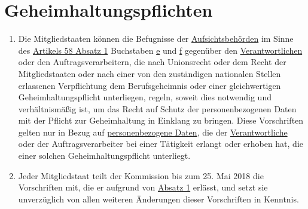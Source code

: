 \chapter{Geheimhaltungspflichten}
\label{ch:90}


\begin{enumerate}

  \item Die Mitgliedstaaten können die Befugnisse der \hyperref[itm:04-21]{Aufsichtsbehörden} im Sinne des \hyperref[itm:58-1]{Artikels 58
   Absatz 1} Buchstaben \hyperref[itm:58-1e]{e} und \hyperref[itm:58-1f]{f} gegenüber den \hyperref[itm:04-7]{Verantwortlichen} oder den
   Auftragsverarbeitern, die nach Unionsrecht oder dem Recht der Mitgliedstaaten oder nach einer von den zuständigen
   nationalen Stellen erlassenen Verpflichtung dem Berufsgeheimnis oder einer gleichwertigen Geheimhaltungspflicht
   unterliegen, regeln, soweit dies notwendig und verhältnismäßig ist, um das Recht auf Schutz der personenbezogenen
   Daten mit der Pflicht zur Geheimhaltung in Einklang zu bringen. Diese Vorschriften gelten nur in Bezug auf
   \hyperref[itm:04-1]{personenbezogene Daten}, die der \hyperref[itm:04-7]{Verantwortliche} oder der Auftragsverarbeiter bei einer Tätigkeit erlangt oder
   erhoben hat, die einer solchen Geheimhaltungspflicht unterliegt.
  \label{itm:90-1}

  \item Jeder Mitgliedstaat teilt der Kommission bis zum 25. Mai 2018 die Vorschriften mit, die er aufgrund von
   \hyperref[itm:90-1]{Absatz 1} erlässt, und setzt sie unverzüglich von allen weiteren Änderungen dieser Vorschriften
    in Kenntnis.
  \label{itm:90-2}

\end{enumerate}


